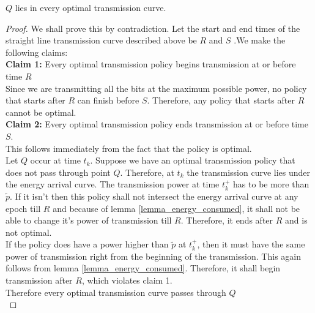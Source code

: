 \begin{lemma}
$Q$ lies in every optimal transmission curve.
\end{lemma}
\begin{proof}
We shall prove this by contradiction. Let the start and end times of the straight line transmission curve described above be $R$ and $S$ .We make the following claims:\\
\textbf{Claim 1:} Every optimal transmission policy begins transmission at or before time $R$\\
Since we are transmitting all the bits at the maximum possible power, no policy that starts after $R$ can finish before $S$. Therefore, any policy that starts after $R$ cannot be optimal.\\
\textbf{Claim 2:} Every optimal transmission policy ends transmission at or before time $S$.\\
This follows immediately from the fact that the policy is optimal. \\
Let $Q$ occur at time $t_k$. Suppose we have an optimal transmission policy that does not pass through point $Q$. Therefore, at $t_k$ the transmission curve lies under the energy arrival curve. The transmission power at time $t_k^+$ has to be more than $\tilde{p}$. If it isn't then this policy shall not intersect the energy arrival curve at any epoch till $R$ and because of lemma \ref{lemma_energy_consumed}, it shall not be able to change it's power of transmission till $R$. Therefore, it ends after $R$ and is not optimal.\\
If the policy does have a power higher than $\tilde{p}$ at $t_k^+$, then it must have the same power of transmission right from the beginning of the transmission. This again follows from lemma \ref{lemma_energy_consumed}. Therefore, it shall begin transmission after $R$, which violates claim 1. \\
Therefore every optimal transmission curve passes through $Q$\\
\end{proof}

